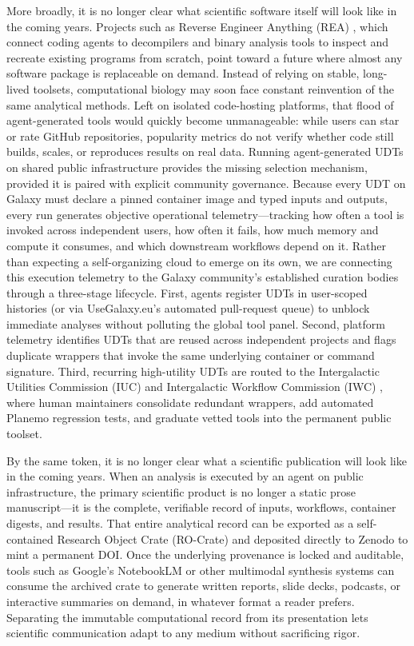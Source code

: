 \documentclass[11pt,letterpaper]{article}
\begin{document}
More broadly, it is no longer clear what scientific software itself will look like in the coming years. Projects such as Reverse Engineer Anything (REA) \cite{rea2026}, which connect coding agents to decompilers and binary analysis tools to inspect and recreate existing programs from scratch, point toward a future where almost any software package is replaceable on demand. Instead of relying on stable, long-lived toolsets, computational biology may soon face constant reinvention of the same analytical methods. Left on isolated code-hosting platforms, that flood of agent-generated tools would quickly become unmanageable: while users can star or rate GitHub repositories, popularity metrics do not verify whether code still builds, scales, or reproduces results on real data. Running agent-generated UDTs on shared public infrastructure provides the missing selection mechanism, provided it is paired with explicit community governance. Because every UDT on Galaxy must declare a pinned container image and typed inputs and outputs, every run generates objective operational telemetry---tracking how often a tool is invoked across independent users, how often it fails, how much memory and compute it consumes, and which downstream workflows depend on it. Rather than expecting a self-organizing cloud to emerge on its own, we are connecting this execution telemetry to the Galaxy community's established curation bodies through a three-stage lifecycle. First, agents register UDTs in user-scoped histories (or via UseGalaxy.eu's automated pull-request queue) to unblock immediate analyses without polluting the global tool panel. Second, platform telemetry identifies UDTs that are reused across independent projects and flags duplicate wrappers that invoke the same underlying container or command signature. Third, recurring high-utility UDTs are routed to the Intergalactic Utilities Commission (IUC) \cite{iuc2026} and Intergalactic Workflow Commission (IWC) \cite{iwc2026}, where human maintainers consolidate redundant wrappers, add automated Planemo regression tests, and graduate vetted tools into the permanent public toolset.

By the same token, it is no longer clear what a scientific publication will look like in the coming years. When an analysis is executed by an agent on public infrastructure, the primary scientific product is no longer a static prose manuscript---it is the complete, verifiable record of inputs, workflows, container digests, and results. That entire analytical record can be exported as a self-contained Research Object Crate (RO-Crate) and deposited directly to Zenodo to mint a permanent DOI. Once the underlying provenance is locked and auditable, tools such as Google's NotebookLM or other multimodal synthesis systems can consume the archived crate to generate written reports, slide decks, podcasts, or interactive summaries on demand, in whatever format a reader prefers. Separating the immutable computational record from its presentation lets scientific communication adapt to any medium without sacrificing rigor.
\end{document}
